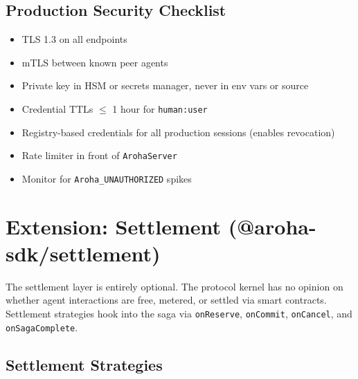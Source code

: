 \documentclass[11pt,a4paper]{article}
\begin{document}
\subsection{Production Security Checklist}

\begin{itemize}[noitemsep]
  \item[$\square$] TLS 1.3 on all endpoints
  \item[$\square$] mTLS between known peer agents
  \item[$\square$] Private key in HSM or secrets manager, never in env vars or source
  \item[$\square$] Credential TTLs $\leq$ 1 hour for \texttt{human:user}
  \item[$\square$] Registry-based credentials for all production sessions (enables revocation)
  \item[$\square$] Rate limiter in front of \texttt{ArohaServer}
  \item[$\square$] Monitor for \texttt{Aroha\_UNAUTHORIZED} spikes
\end{itemize}

\section{Extension: Settlement (@aroha-sdk/settlement)}

The settlement layer is entirely optional. The protocol kernel has no opinion on
whether agent interactions are free, metered, or settled via smart contracts.
Settlement strategies hook into the saga via \texttt{onReserve}, \texttt{onCommit},
\texttt{onCancel}, and \texttt{onSagaComplete}.

\subsection{Settlement Strategies}
\end{document}

